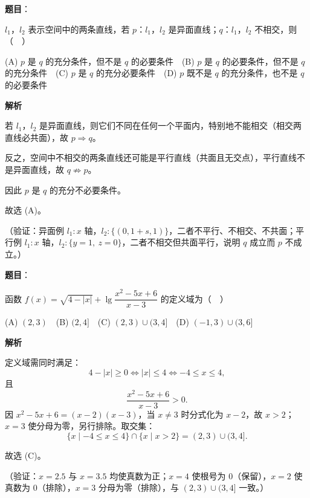 \begin{answer}

\textbf{题目}：

\(l_1\)，\(l_2\) 表示空间中的两条直线，若 \(p\)：\(l_1\)，\(l_2\) 是异面直线；\(q\)：\(l_1\)，\(l_2\) 不相交，则（　）

(A) \(p\) 是 \(q\) 的充分条件，但不是 \(q\) 的必要条件　(B) \(p\) 是 \(q\) 的必要条件，但不是 \(q\) 的充分条件　(C) \(p\) 是 \(q\) 的充分必要条件　(D) \(p\) 既不是 \(q\) 的充分条件，也不是 \(q\) 的必要条件

\textbf{解析}

若 \(l_1\)，\(l_2\) 是异面直线，则它们不同在任何一个平面内，特别地不能相交（相交两直线必共面），故 \(p\Rightarrow q\)。

反之，空间中不相交的两条直线还可能是平行直线（共面且无交点），平行直线不是异面直线，故 \(q\not\Rightarrow p\)。

因此 \(p\) 是 \(q\) 的充分不必要条件。

故选 (A)。

（验证：异面例 \(l_1:x\) 轴，\(l_2:\{(0,1+s,1)\}\)，二者不平行、不相交、不共面；平行例 \(l_1:x\) 轴，\(l_2:\{y=1,\ z=0\}\)，二者不相交但共面平行，说明 \(q\) 成立而 \(p\) 不成立。）


\end{answer}
\begin{answer}

\textbf{题目}：

函数 \(f(x)=\sqrt{4-|x|}+\lg\dfrac{x^2-5x+6}{x-3}\) 的定义域为（　）

(A) \((2,3)\)　(B) \((2,4]\)　(C) \((2,3)\cup(3,4]\)　(D) \((-1,3)\cup(3,6]\)

\textbf{解析}

定义域需同时满足：
\nopagebreak[4]
\[
4-|x|\geqslant0\iff|x|\leqslant4\iff-4\leqslant x\leqslant4,
\]
且
\nopagebreak[4]
\[
\frac{x^2-5x+6}{x-3}>0.
\]
因 \(x^2-5x+6=(x-2)(x-3)\)，当 \(x\neq3\) 时分式化为 \(x-2\)，故 \(x>2\)；\(x=3\) 使分母为零，另行排除。取交集：
\nopagebreak[4]
\[
\{x\mid-4\leqslant x\leqslant4\}\cap\{x\mid x>2\}=(2,3)\cup(3,4].
\]

故选 (C)。

（验证：\(x=2.5\) 与 \(x=3.5\) 均使真数为正；\(x=4\) 使根号为 \(0\)（保留），\(x=2\) 使真数为 \(0\)（排除），\(x=3\) 分母为零（排除），与 \((2,3)\cup(3,4]\) 一致。）


\end{answer}
